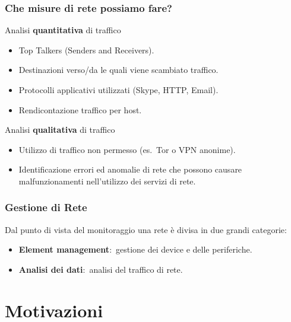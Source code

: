 \subsubsection{Che misure di rete possiamo fare?}

Analisi \textbf{quantitativa} di traffico
\begin{itemize}
    \item Top Talkers (Senders and Receivers).
    \item Destinazioni verso/da le quali viene scambiato traffico.
    \item Protocolli applicativi utilizzati (Skype, HTTP, Email).
    \item Rendicontazione traffico per host.
\end{itemize}
Analisi \textbf{qualitativa} di traffico
\begin{itemize}
    \item Utilizzo di traffico non permesso (es.\ Tor o VPN anonime).
    \item Identificazione errori ed anomalie di rete che possono causare malfunzionamenti nell'utilizzo dei servizi di rete.
\end{itemize}

\subsubsection{Gestione di Rete}

Dal punto di vista del monitoraggio una rete è divisa in due grandi categorie:\
\begin{itemize}
    \item \textbf{Element management}:\ gestione dei device e delle periferiche.
    \item \textbf{Analisi dei dati}:\ analisi del traffico di rete.
\end{itemize}

\section{Motivazioni}

